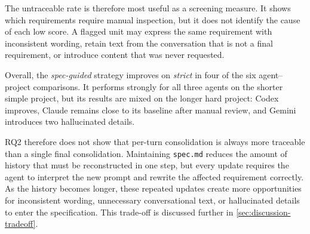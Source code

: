 The untraceable rate is therefore most useful as a screening measure. It shows
which requirements require manual inspection, but it does not identify the
cause of each low score. A flagged unit may express the same requirement with
inconsistent wording, retain text from the conversation that is not a final
requirement, or introduce content that was never requested.

Overall, the \emph{spec-guided} strategy improves on \emph{strict} in four
of the six agent--project comparisons. It performs strongly for all three
agents on the shorter simple project, but its results are mixed on the longer
hard project: Codex improves, Claude remains close to its baseline after
manual review, and Gemini introduces two hallucinated details.

RQ2 therefore does not show that per-turn consolidation is always more
traceable than a single final consolidation. Maintaining \texttt{spec.md}
reduces the amount of history that must be reconstructed in one step, but
every update requires the agent to interpret the new prompt and rewrite the
affected requirement correctly. As the history becomes longer, these repeated
updates create more opportunities for inconsistent wording, unnecessary
conversational text, or hallucinated details to enter the specification. This
trade-off is discussed further in \cref{sec:discussion-tradeoff}.

